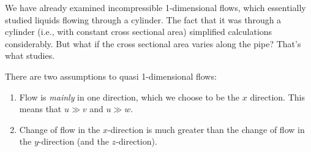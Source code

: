 \begin{node}
We have already examined incompressible 1-dimensional flows, which
essentially studied liquids flowing through a cylinder. The fact that
it was through a cylinder (i.e., with constant cross sectional area)
simplified calculations considerably. But what if the cross sectional
area varies along the pipe? That's what 
studies.
\end{node}

\begin{assume}
There are two assumptions to quasi 1-dimensional flows:
\begin{enumerate}
\item Flow is \emph{mainly} in one direction, which we choose to be
  the $x$ direction. This means that $u\gg v$ and $u\gg w$.
\item Change of flow in the $x$-direction is much greater than the
  change of flow in the $y$-direction (and the $z$-direction).
\end{enumerate}
\end{assume}


